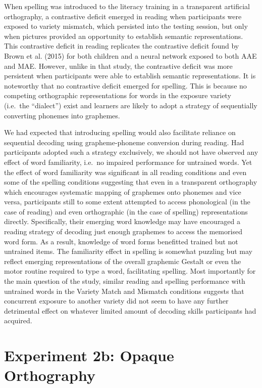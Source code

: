 \documentclass[doc,floatsintext]{apa6}
\begin{document}
When spelling was introduced to the literacy training in a transparent
artificial orthography, a contrastive deficit emerged in reading when
participants were exposed to variety mismatch, which persisted into the
testing session, but only when pictures provided an opportunity to
establish semantic representations. This contrastive deficit in reading
replicates the contrastive deficit found by Brown et al. (2015) for both
children and a neural network exposed to both AAE and MAE. However,
unlike in that study, the contrastive deficit was more persistent when
participants were able to establish semantic representations. It is
noteworthy that no contrastive deficit emerged for spelling. This is
because no competing orthographic representations for words in the
exposure variety (i.e.~the \enquote{dialect}) exist and learners are
likely to adopt a strategy of sequentially converting phonemes into
graphemes.

We had expected that introducing spelling would also facilitate reliance
on sequential decoding using grapheme-phoneme conversion during reading.
Had participants adopted such a strategy exclusively, we should not have
observed any effect of word familiarity, i.e.~no impaired performance
for untrained words. Yet the effect of word familiarity was significant
in all reading conditions and even some of the spelling conditions
suggesting that even in a transparent orthography which encourages
systematic mapping of graphemes onto phonemes and vice versa,
participants still to some extent attempted to access phonological (in
the case of reading) and even orthographic (in the case of spelling)
representations directly. Specifically, their emerging word knowledge
may have encouraged a reading strategy of decoding just enough graphemes
to access the memorised word form. As a result, knowledge of word forms
benefitted trained but not untrained items. The familiarity effect in
spelling is somewhat puzzling but may reflect emerging representations
of the overall graphemic Gestalt or even the motor routine required to
type a word, facilitating spelling. Most importantly for the main
question of the study, similar reading and spelling performance with
untrained words in the Variety Match and Mismatch conditions suggests
that concurrent exposure to another variety did not seem to have any
further detrimental effect on whatever limited amount of decoding skills
participants had acquired.

\section{Experiment 2b: Opaque
Orthography}\label{experiment-2b-opaque-orthography}
\end{document}
